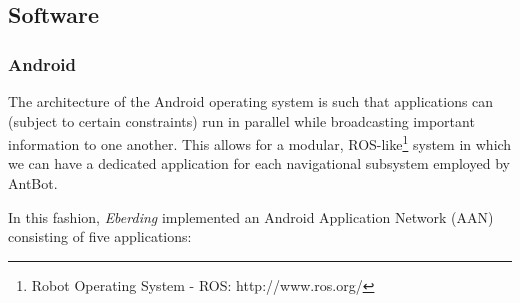 \documentclass[a4paper,11pt,twoside,openright]{article}
\begin{document}
\subsection{ Software }
\subsubsection{ Android } \label{subsubsec:droid}
The architecture of the Android operating system is such that applications can (subject to certain
constraints) run in parallel while broadcasting important information to one another. This allows
for a modular, ROS-like\footnote{Robot Operating System - ROS: http://www.ros.org/}
system in which we can have a dedicated application for each navigational subsystem employed by AntBot.
\newline

In this fashion, \textit{Eberding} implemented an Android Application Network (AAN) consisting of
five applications:
\newline
\end{document}
